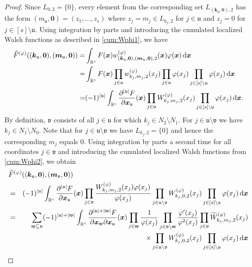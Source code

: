 \documentclass[namedate,webpdf,imanum]{ima-authoring-arxiv}%
\theoremstyle{thmstyletwo}%
\numberwithin{equation}{section}
\newcommand{\rd}{\, {\rm d}}
\newcommand{\bsx}{\boldsymbol{x}}
\newcommand{\bsk}{\boldsymbol{k}}
\newcommand{\bsm}{\boldsymbol{m}}
\newcommand{\bszero}{\boldsymbol{0}}
\newcommand{\uu}{\mathfrak{u}}
\newcommand{\vv}{\mathfrak{v}}
\newcommand{\ww}{\mathfrak{w}}
\begin{document}
\begin{proof}
Since $L_{0,2}=\{0\}$, every element from the corresponding set $L_{(\bsk_\uu,\bszero),2}$ has the form $(m_\uu,\bszero)=(z_1,\ldots,z_s)$ where $z_j=m_j \in L_{k_j,2}$ for $j \in \uu$ and $z_j=0$ for $j \in [s]\setminus \uu$. Using integration by parts and introducing the cumulated localized Walsh functions as described in \eqref{cum:Wphi1}, we have
\begin{align*}
\widehat{F}^{(\varphi)}((\bsk_\uu,\bszero),(\bsm_\uu,\bszero)) 
= & \int_{\mathbb{R}^s} F(\bsx) w^{(\varphi)}_{(\bsk_\uu,\bszero),(\bsm_\uu,\bszero),2}(\bsx) \varphi(\bsx) \rd \bsx\\
= & \int_{\mathbb{R}^s} F(\bsx) \prod_{j \in \uu} w^{(\varphi)}_{k_j,m_j,2}(x_j) \prod_{j \in \uu}\varphi(x_j) \prod_{j \in [s] \setminus \uu}\varphi(x_j) \rd \bsx\\
= & (-1)^{|\uu|} \int_{\mathbb{R}^s} \frac{\partial^{|\uu|} F}{\partial \bsx_\uu}(\bsx) \prod_{j \in \uu} W_{k_j,m_j,2}^{(\varphi)}(x_j) \prod_{j \in [s]\setminus \uu} \varphi(x_j) \rd \bsx.
\end{align*}
By definition, $\vv$ consists of all $j \in \uu$ for which $k_j \in N_2 \setminus N_1$. For $j \in \uu \setminus \vv$ we have $k_j \in N_1 \setminus N_0$. Note that for $j \in \uu \setminus \vv$ we have $L_{k_j,2}=\{0\}$ and hence the corresponding $m_j$ equals 0. Using integration by parts a second time for all coordinates $j \in \vv$ and introducing the cumulated localized Walsh functions from \eqref{cum:Wphi2}, we obtain
\begin{eqnarray*}
\lefteqn{\widehat{F}^{(\varphi)}((\bsk_\uu,\bszero),(\bsm_\vv,\bszero))}  \\
& = & (-1)^{|\uu|} \int_{\mathbb{R}^s} \frac{\partial^{|\uu|} F}{\partial \bsx_\uu}(\bsx)  \prod_{j \in \vv} \frac{W_{k_j,m_j,2}^{(\varphi)}(x_j) \varphi(x_j)}{\varphi(x_j)} \prod_{j \in \uu \setminus \vv} W^{(\varphi)}_{k_j,0, 2}(x_j) \prod_{j \in [s]\setminus \uu} \varphi(x_j) \rd \bsx \\
& = & \sum_{\ww \subseteq \vv}  (-1)^{|\uu| + |\ww|}  \int_{\mathbb{R}^s} \frac{\partial^{|\uu| + |\ww|} F}{\partial \bsx_\ww \partial \bsx_{\uu}}(\bsx) \prod_{j \in \ww} \frac{1}{\varphi(x_j)} \prod_{j \in \vv \setminus \ww} \frac{\varphi'(x_j)}{\varphi^2(x_j)} \prod_{j \in \vv} \widetilde{W}_{k_j,m_j,2}^{(\varphi)}(x_j) \\
& & \qquad \qquad \qquad \qquad \times \prod_{j \in \uu \setminus \vv} W^{(\varphi)}_{k_j, 0, 2}(x_j) \prod_{j \in [s]\setminus \uu} \varphi(x_j)  \rd \bsx\\

\end{eqnarray*}
\end{proof}
\end{document}
